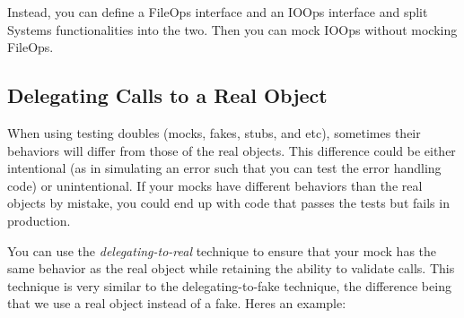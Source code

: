 Instead, you can define a {\ttfamily File\+Ops} interface and an {\ttfamily I\+O\+Ops} interface and split {\ttfamily System}\textquotesingle{}s functionalities into the two. Then you can mock {\ttfamily I\+O\+Ops} without mocking {\ttfamily File\+Ops}.

\subsection*{Delegating Calls to a Real Object}

When using testing doubles (mocks, fakes, stubs, and etc), sometimes their behaviors will differ from those of the real objects. This difference could be either intentional (as in simulating an error such that you can test the error handling code) or unintentional. If your mocks have different behaviors than the real objects by mistake, you could end up with code that passes the tests but fails in production.

You can use the {\itshape delegating-\/to-\/real} technique to ensure that your mock has the same behavior as the real object while retaining the ability to validate calls. This technique is very similar to the delegating-\/to-\/fake technique, the difference being that we use a real object instead of a fake. Here\textquotesingle{}s an example\+:


\begin{DoxyCode}{0}
\DoxyCodeLine{}
\DoxyCodeLine{  \}}
\DoxyCodeLine{\};}
\DoxyCodeLine{}
\DoxyCodeLine{}
\end{DoxyCode}


